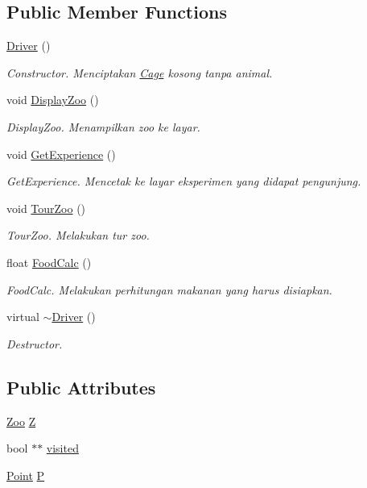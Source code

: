 \subsection*{Public Member Functions}
\begin{DoxyCompactItemize}
\item 
\hyperlink{classDriver_af0658d103e3e810a8e9ef0a53bb2e261}{Driver} ()
\begin{DoxyCompactList}\small\item\em Constructor. Menciptakan \hyperlink{classCage}{Cage} kosong tanpa animal. \end{DoxyCompactList}\item 
void \hyperlink{classDriver_aa8b4e139b99aad4720ce86286783dcdb}{Display\+Zoo} ()
\begin{DoxyCompactList}\small\item\em Display\+Zoo. Menampilkan zoo ke layar. \end{DoxyCompactList}\item 
void \hyperlink{classDriver_a2bc17a8251eab4cfdb7d74c7f7299c6e}{Get\+Experience} ()
\begin{DoxyCompactList}\small\item\em Get\+Experience. Mencetak ke layar eksperimen yang didapat pengunjung. \end{DoxyCompactList}\item 
void \hyperlink{classDriver_aa56ed0eaa789f78765708e15032d6534}{Tour\+Zoo} ()
\begin{DoxyCompactList}\small\item\em Tour\+Zoo. Melakukan tur zoo. \end{DoxyCompactList}\item 
float \hyperlink{classDriver_a0f85e40efd4983b0434307ca0647f378}{Food\+Calc} ()
\begin{DoxyCompactList}\small\item\em Food\+Calc. Melakukan perhitungan makanan yang harus disiapkan. \end{DoxyCompactList}\item 
virtual \hyperlink{classDriver_a2864fd05273f30e23aa959c92ef8a5b9}{$\sim$\+Driver} ()
\begin{DoxyCompactList}\small\item\em Destructor. \end{DoxyCompactList}\end{DoxyCompactItemize}
\subsection*{Public Attributes}
\begin{DoxyCompactItemize}
\item 
\hyperlink{classZoo}{Zoo} \hyperlink{classDriver_a15f54a382cba3cdcf82c396cecfa3f9e}{Z}
\item 
bool $\ast$$\ast$ \hyperlink{classDriver_ab338d327140ab7a1a9469d5c16c2697f}{visited}
\item 
\hyperlink{classPoint}{Point} \hyperlink{classDriver_a967bca94eece374e66e7ed827f22cf51}{P}
\end{DoxyCompactItemize}



